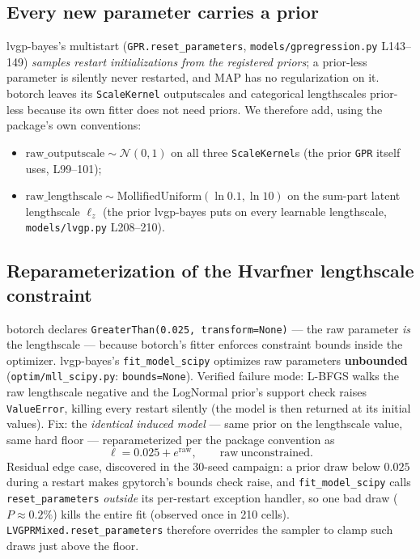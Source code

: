 \documentclass[11pt]{article}
\begin{document}
\subsection{Every new parameter carries a prior}
lvgp-bayes's multistart (\texttt{GPR.reset\_parameters},
\texttt{models/gpregression.py} L143--149) \emph{samples restart initializations from the
registered priors}; a prior-less parameter is silently never restarted, and MAP has no
regularization on it. botorch leaves its \texttt{ScaleKernel} outputscales and categorical
lengthscales prior-less because its own fitter does not need priors. We therefore add, using
the package's own conventions:
\begin{itemize}
\item $\mathrm{raw\_outputscale} \sim \mathcal N(0,1)$ on all three \texttt{ScaleKernel}s
(the prior \texttt{GPR} itself uses, L99--101);
\item $\mathrm{raw\_lengthscale} \sim \mathrm{MollifiedUniform}(\ln 0.1, \ln 10)$ on the
sum-part latent lengthscale $\ell_z$ (the prior lvgp-bayes puts on every learnable
lengthscale, \texttt{models/lvgp.py} L208--210).
\end{itemize}

\subsection{Reparameterization of the Hvarfner lengthscale constraint}
botorch declares \texttt{GreaterThan(0.025, transform=None)} --- the raw parameter \emph{is}
the lengthscale --- because botorch's fitter enforces constraint bounds inside the optimizer.
lvgp-bayes's \texttt{fit\_model\_scipy} optimizes raw parameters \textbf{unbounded}
(\texttt{optim/mll\_scipy.py}: \texttt{bounds=None}). Verified failure mode: L-BFGS walks the
raw lengthscale negative and the LogNormal prior's support check raises \texttt{ValueError},
killing every restart silently (the model is then returned at its initial values). Fix: the
\emph{identical induced model} --- same prior on the lengthscale value, same hard floor ---
reparameterized per the package convention as
$$\ell = 0.025 + e^{\mathrm{raw}},\qquad \mathrm{raw}\ \text{unconstrained.}$$
Residual edge case, discovered in the 30-seed campaign: a prior draw below $0.025$ during a
restart makes gpytorch's bounds check raise, and \texttt{fit\_model\_scipy} calls
\texttt{reset\_parameters} \emph{outside} its per-restart exception handler, so one bad draw
($P \approx 0.2\%$) kills the entire fit (observed once in 210 cells).
\texttt{LVGPRMixed.reset\_parameters} therefore overrides the sampler to clamp such draws
just above the floor.
\end{document}
